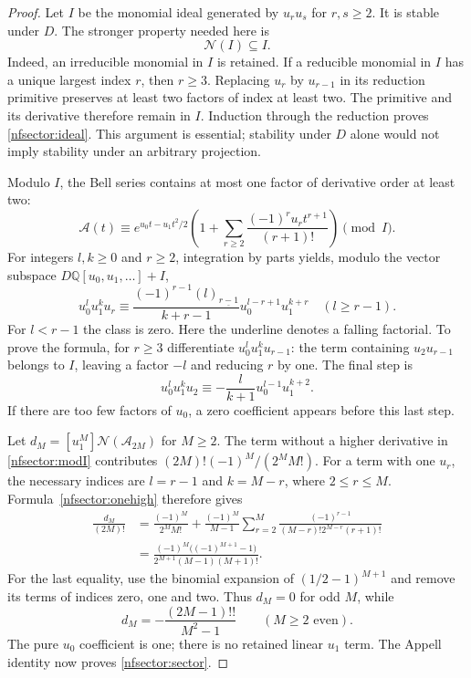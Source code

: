 \begin{proof}
Let $I$ be the monomial ideal generated by $u_r u_s$ for $r,s\ge2$.
It is stable under $D$.  The stronger property needed here is
\begin{equation}\label{nfsector:ideal}
                   \mathcal N(I)\subseteq I.
\end{equation}
Indeed, an irreducible monomial in $I$ is retained.  If a reducible
monomial in $I$ has a unique largest index $r$, then $r\ge3$.
Replacing $u_r$ by $u_{r-1}$ in its reduction primitive preserves at
least two factors of index at least two.  The primitive and its
derivative therefore remain in $I$.  Induction through the reduction
proves \eqref{nfsector:ideal}.  This argument is essential; stability
under $D$ alone would not imply stability under an arbitrary projection.

Modulo $I$, the Bell series contains at most one factor of derivative
order at least two:
\begin{equation}\label{nfsector:modI}
 \mathcal A(t)\equiv
 e^{u_0t-u_1t^2/2}
 \left(1+\sum_{r\ge2}\frac{(-1)^ru_rt^{r+1}}{(r+1)!}\right)
 \pmod I.
\end{equation}
For integers $l,k\ge0$ and $r\ge2$, integration by parts yields,
modulo the vector subspace $D\mathbb Q[u_0,u_1,\ldots]+I$,
\begin{equation}\label{nfsector:onehigh}
 u_0^l u_1^k u_r\equiv
 \frac{(-1)^{r-1}(l)_{\underline{r-1}}}{k+r-1}
       u_0^{l-r+1}u_1^{k+r}
       \quad(l\ge r-1).
\end{equation}
For $l<r-1$ the class is zero.  Here the underline denotes a falling
factorial.  To prove the formula, for $r\ge3$ differentiate
$u_0^l u_1^k u_{r-1}$: the term containing $u_2u_{r-1}$ belongs
to $I$, leaving a factor $-l$ and reducing $r$ by one.
The final step is
\[
 u_0^l u_1^k u_2\equiv
       -\frac{l}{k+1}u_0^{l-1}u_1^{k+2}.
\]
If there are too few factors of $u_0$, a zero coefficient appears
before this last step.

Let $d_M=[u_1^M]\mathcal N(\mathcal A_{2M})$ for $M\ge2$.
The term without a higher derivative in \eqref{nfsector:modI}
contributes $(2M)!(-1)^M/(2^MM!)$.  For a term with one $u_r$,
the necessary indices are $l=r-1$ and $k=M-r$, where $2\le r\le M$.
Formula~\eqref{nfsector:onehigh} therefore gives
\begin{align*}
 \frac{d_M}{(2M)!}
 &=\frac{(-1)^M}{2^MM!}
   +\frac{(-1)^M}{M-1}
       \sum_{r=2}^{M}
       \frac{(-1)^{r-1}}{(M-r)!2^{M-r}(r+1)!}\\
 &=\frac{(-1)^M\bigl((-1)^{M+1}-1\bigr)}
       {2^{M+1}(M-1)(M+1)!}.
\end{align*}
For the last equality, use the binomial expansion of
$(1/2-1)^{M+1}$ and remove its terms of indices zero, one and two.
Thus $d_M=0$ for odd $M$, while
\[
 d_M=-\frac{(2M-1)!!}{M^2-1}\qquad(M\ge2\text{ even}).
\]
The pure $u_0$ coefficient is one; there is no retained linear $u_1$
term.  The Appell identity now proves \eqref{nfsector:sector}.


\end{proof}
